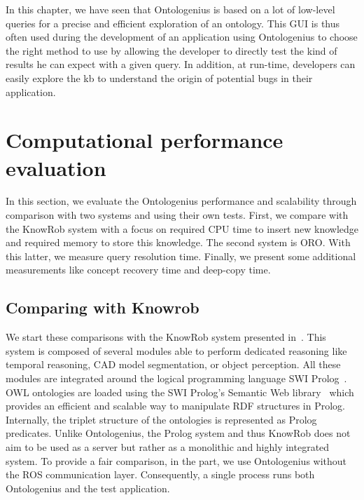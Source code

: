 In this chapter, we have seen that Ontologenius is based on a lot of low-level queries for a precise and efficient exploration of an ontology. This GUI is thus often used during the development of an application using Ontologenius to choose the right method to use by allowing the developer to directly test the kind of results he can expect with a given query. In addition, at run-time, developers can easily explore the \acrshort{kb} to understand the origin of potential bugs in their application.

\section{Computational performance evaluation}

In this section, we evaluate the Ontologenius performance and scalability through comparison with two systems and using their own tests. First, we compare with the KnowRob system with a focus on required CPU time to insert new knowledge and required memory to store this knowledge. The second system is ORO. With this latter, we measure query resolution time. Finally, we present some additional measurements like concept recovery time and deep-copy time.

\subsection{Comparing with Knowrob}

We start these comparisons with the KnowRob system presented in~\cite{tenorth_2013_knowrob}. This system is composed of several modules able to perform dedicated reasoning like temporal reasoning, CAD model segmentation, or object perception. All these modules are integrated around the logical programming language SWI Prolog~\cite{wielemaker_2012_swi}. OWL ontologies are loaded using the SWI Prolog’s Semantic Web library~\cite{wielemaker_2003_prolog} which provides an efficient and scalable way to manipulate RDF structures in Prolog. Internally, the triplet structure of the ontologies is represented as Prolog predicates. Unlike Ontologenius, the Prolog system and thus KnowRob does not aim to be used as a server but rather as a monolithic and highly integrated system. To provide a fair comparison, in the part, we use Ontologenius without the ROS communication layer. Consequently, a single process runs both Ontologenius and the test application.

